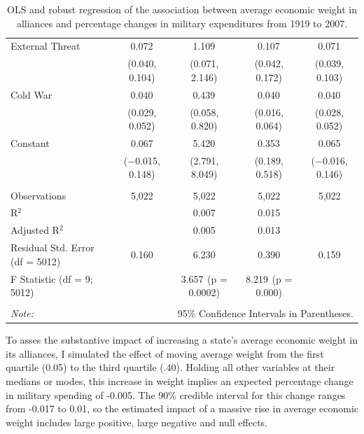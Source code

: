 \documentclass[12pt]{article}
\begin{document}
\begin{table}[!htbp]
\begin{tabular}{@{\extracolsep{0pt}}lcccc}
  External Threat & 0.072$^{}$ & 1.109$^{}$ & 0.107$^{}$ & 0.071$^{}$ \\ 
  & (0.040, 0.104) & (0.071, 2.146) & (0.042, 0.172) & (0.039, 0.103) \\ 
  Cold War & 0.040$^{}$ & 0.439$^{}$ & 0.040$^{}$ & 0.040$^{}$ \\ 
  & (0.029, 0.052) & (0.058, 0.820) & (0.016, 0.064) & (0.028, 0.052) \\ 
  Constant & 0.067 & 5.420$^{}$ & 0.353$^{}$ & 0.065 \\ 
  & ($-$0.015, 0.148) & (2.791, 8.049) & (0.189, 0.518) & ($-$0.016, 0.146) \\ 
 \hline \\[-1.8ex] 
Observations & 5,022 & 5,022 & 5,022 & 5,022 \\ 
R$^{2}$ &  & 0.007 & 0.015 &  \\ 
Adjusted R$^{2}$ &  & 0.005 & 0.013 &  \\ 
Residual Std. Error (df = 5012) & 0.160 & 6.230 & 0.390 & 0.159 \\ 
F Statistic (df = 9; 5012) &  & 3.657$^{}$  (p = 0.0002) & 8.219$^{}$  (p = 0.000) &  \\ 
\hline 
\hline \\[-1.8ex] 
\textit{Note:}  & \multicolumn{4}{r}{95\% Confidence Intervals in Parentheses.} \\ 
\end{tabular} 
  \caption{OLS and robust regression of the association between average economic weight in alliances
and percentage changes in military expenditures from 1919 to 2007.} 
  \label{tab:avg-weight-res} 
\end{table} 

To asses the substantive impact of increasing a state's average economic weight in its alliances, I simulated the effect of moving average weight from the first quartile (0.05) to the third quartile (.40). 
Holding all other variables at their medians or modes, this increase in weight implies an expected percentage change in military spending of -0.005. 
The 90\% credible interval for this change ranges from -0.017 to 0.01, so the estimated impact of a massive rise in average economic weight includes large positive, large negative and null effects. 



\newpage
\singlespace


 
\end{document}
